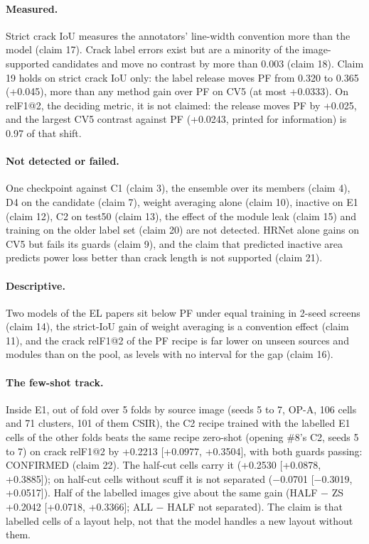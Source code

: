 \paragraph{Measured.} Strict crack IoU measures the annotators' line-width convention more than the model (claim 17). Crack label
errors exist but are a minority of the image-supported candidates and move no contrast by more than 0.003 (claim 18). Claim 19 holds
on strict crack IoU only: the label release moves PF from 0.320 to 0.365 (+0.045), more than any method gain over PF on CV5 (at most
+0.0333). On relF1@2, the deciding metric, it is not claimed: the release moves PF by +0.025, and the largest CV5 contrast against PF
(+0.0243, printed for information) is 0.97 of that shift.

\paragraph{Not detected or failed.} One checkpoint against C1 (claim 3), the ensemble over its members (claim 4), D4 on the
candidate (claim 7), weight averaging alone (claim 10), inactive on E1 (claim 12), C2 on test50 (claim 13), the effect of the module
leak (claim 15) and training on the older label set (claim 20) are not detected. HRNet alone gains on CV5 but fails its guards (claim
9), and the claim that predicted inactive area predicts power loss better than crack length is not supported (claim 21).

\paragraph{Descriptive.} Two models of the EL papers sit below PF under equal training in 2-seed screens (claim 14), the strict-IoU
gain of weight averaging is a convention effect (claim 11), and the crack relF1@2 of the PF recipe is far lower on unseen sources
and modules than on the pool, as levels with no interval for the gap (claim 16).

\paragraph{The few-shot track.} Inside E1, out of fold over 5 folds by source image (seeds 5 to 7, OP-A, 106 cells and 71
clusters, 101 of them CSIR), the C2 recipe trained with the labelled E1 cells of the other folds beats the same recipe zero-shot
(opening \#8's C2, seeds 5 to 7) on crack relF1@2 by +0.2213 [+0.0977, +0.3504], with both guards passing: CONFIRMED (claim 22).
The half-cut cells carry it (+0.2530 [+0.0878, +0.3885]); on half-cut cells without scuff it is not separated ($-$0.0701
[$-$0.3019, +0.0517]). Half of the labelled images give about the same gain (HALF $-$ ZS +0.2042 [+0.0718, +0.3366]; ALL $-$
HALF not separated). The claim is that labelled cells of a layout help, not that the model handles a new layout without them.

